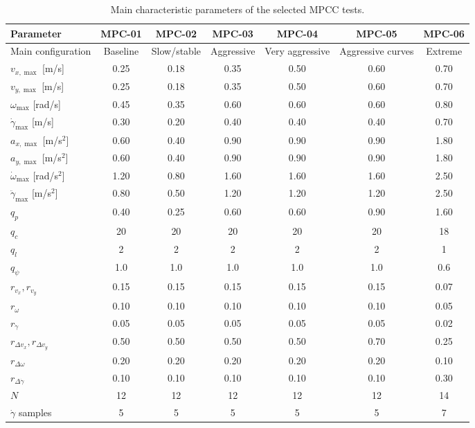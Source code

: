 \begin{table}[H]
\centering
\caption{Main characteristic parameters of the selected MPCC tests.}
\label{tab:mpcc_characteristic_parameters}
\scriptsize
\setlength{\tabcolsep}{3pt}
\renewcommand{\arraystretch}{1.05}
\begin{tabular}{lcccccc}
\toprule
\textbf{Parameter} &
\textbf{MPC-01} &
\textbf{MPC-02} &
\textbf{MPC-03} &
\textbf{MPC-04} &
\textbf{MPC-05} &
\textbf{MPC-06} \\
\midrule
Main configuration 
& Baseline 
& Slow/stable 
& Aggressive 
& Very aggressive 
& Aggressive curves 
& Extreme \\
\midrule
\(v_{x,\max}\) [m/s]          
& 0.25 & 0.18 & 0.35 & 0.50 & 0.60 & 0.70 \\
\(v_{y,\max}\) [m/s]          
& 0.25 & 0.18 & 0.35 & 0.50 & 0.60 & 0.70 \\
\(\omega_{\max}\) [rad/s]     
& 0.45 & 0.35 & 0.60 & 0.60 & 0.60 & 0.80 \\
\(\dot{\gamma}_{\max}\) [m/s] 
& 0.30 & 0.20 & 0.40 & 0.40 & 0.40 & 0.70 \\
\midrule
\(a_{x,\max}\) [m/s\(^2\)]    
& 0.60 & 0.40 & 0.90 & 0.90 & 0.90 & 1.80 \\
\(a_{y,\max}\) [m/s\(^2\)]    
& 0.60 & 0.40 & 0.90 & 0.90 & 0.90 & 1.80 \\
\(\dot{\omega}_{\max}\) [rad/s\(^2\)] 
& 1.20 & 0.80 & 1.60 & 1.60 & 1.60 & 2.50 \\
\(\ddot{\gamma}_{\max}\) [m/s\(^2\)] 
& 0.80 & 0.50 & 1.20 & 1.20 & 1.20 & 2.50 \\
\midrule
\(q_p\)                       
& 0.40 & 0.25 & 0.60 & 0.60 & 0.90 & 1.60 \\
\(q_c\)                       
& 20 & 20 & 20 & 20 & 20 & 18 \\
\(q_l\)                       
& 2 & 2 & 2 & 2 & 2 & 1 \\
\(q_{\psi}\)                  
& 1.0 & 1.0 & 1.0 & 1.0 & 1.0 & 0.6 \\
\midrule
\(r_{v_x}, r_{v_y}\)          
& 0.15 & 0.15 & 0.15 & 0.15 & 0.15 & 0.07 \\
\(r_{\omega}\)                
& 0.10 & 0.10 & 0.10 & 0.10 & 0.10 & 0.05 \\
\(r_{\dot{\gamma}}\)          
& 0.05 & 0.05 & 0.05 & 0.05 & 0.05 & 0.02 \\
\(r_{\Delta v_x}, r_{\Delta v_y}\) 
& 0.50 & 0.50 & 0.50 & 0.50 & 0.70 & 0.25 \\
\(r_{\Delta \omega}\)         
& 0.20 & 0.20 & 0.20 & 0.20 & 0.20 & 0.10 \\
\(r_{\Delta \dot{\gamma}}\)   
& 0.10 & 0.10 & 0.10 & 0.10 & 0.10 & 0.30 \\
\midrule
\(N\)                         
& 12 & 12 & 12 & 12 & 12 & 14 \\
\(\dot{\gamma}\) samples      
& 5 & 5 & 5 & 5 & 5 & 7 \\
\bottomrule
\end{tabular}
\end{table}


